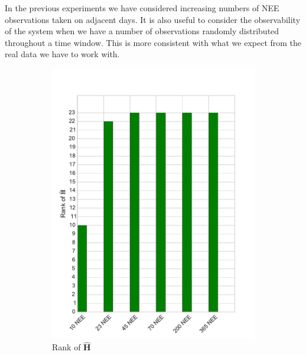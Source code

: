 In the previous experiments we have considered increasing numbers of NEE observations taken on adjacent days. It is also useful to consider the observability of the system when we have a number of observations randomly distributed throughout a time window. This is more consistent with what we expect from the real data we have to work with.  

\begin{figure}[ht]
    \centering
    \begin{subfigure}[b]{0.4\textwidth}
        \includegraphics[width=\textwidth]{chapter/chapter5/dalec2_obsrankwind.pdf}
        \caption{Rank of $\hat{\textbf{H}}$}
        \label{chap5:fig:D2_observailityrankwind}
    \end{subfigure}
    \begin{subfigure}[b]{0.4\textwidth}

\end{subfigure}
\end{figure}
